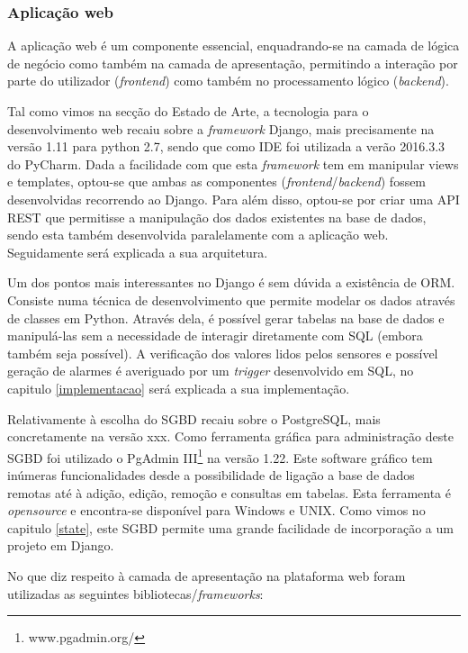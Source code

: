 \subsubsection{Aplicação web}

A aplicação web é um componente essencial, enquadrando-se na camada de lógica de negócio como também na camada de apresentação, permitindo a interação por parte do utilizador (\textit{frontend}) como também no processamento lógico (\textit{backend}).   

Tal como vimos na secção do Estado de Arte, a tecnologia para o desenvolvimento web recaiu sobre a \textit{framework} Django, mais precisamente na versão 1.11 para python 2.7, sendo que como \ac{IDE} foi utilizada a verão 2016.3.3 do PyCharm. Dada a facilidade com que esta \textit{framework} tem em manipular views e templates, optou-se que ambas as componentes (\textit{frontend}/\textit{backend}) fossem desenvolvidas recorrendo ao Django. Para além disso, optou-se por criar uma API REST que permitisse a manipulação dos dados existentes na base de dados, sendo esta também desenvolvida paralelamente com a aplicação web. Seguidamente será explicada a sua arquitetura.   

Um dos pontos mais interessantes no Django é sem dúvida a existência de \ac{ORM}. Consiste numa técnica de desenvolvimento que permite modelar os dados através de classes em Python. Através dela, é possível gerar tabelas na base de dados e manipulá-las sem a necessidade de interagir diretamente com \ac{SQL} (embora também seja possível). A verificação dos valores lidos pelos sensores e possível geração de alarmes é averiguado por um \textit{trigger} desenvolvido em \ac{SQL}, no capitulo \ref{implementacao} será explicada a sua implementação.  


Relativamente à escolha do \ac{SGBD} recaiu sobre o PostgreSQL, mais concretamente na versão xxx. Como ferramenta gráfica para administração deste \ac{SGBD} foi utilizado o PgAdmin III\footnote{www.pgadmin.org/} na versão 1.22. Este software gráfico tem inúmeras funcionalidades desde a possibilidade de ligação a base de dados remotas até à adição, edição, remoção e  consultas em tabelas. Esta ferramenta é \textit{opensource} e encontra-se disponível para Windows e UNIX. Como vimos no capitulo \ref{state}, este \ac{SGBD} permite uma grande facilidade de incorporação a um projeto em Django. 


No que diz respeito à camada de apresentação na plataforma web foram utilizadas as seguintes bibliotecas/\textit{frameworks}: 


